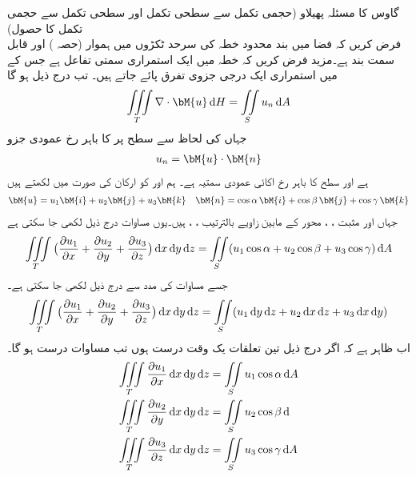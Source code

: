 \quad گاوس کا مسئلہ پھیلاو (حجمی تکمل سے سطحی تکمل اور سطحی تکمل سے حجمی تکمل کا حصول)\\
فرض کریں کہ فضا میں بند محدود خطہ  کی سرحد  ٹکڑوں میں ہموار (حصہ ) اور قابل سمت بند ہے۔مزید فرض کریں کہ خطہ  میں  ایک استمراری سمتی تفاعل ہے جس کے  میں استمراری ایک درجی جزوی تفرق پائے جاتے ہیں۔ تب درج ذیل ہو گا
\begin{align}\label{مساوات_خطی_تکمل_مسئلہ_گاوس_الف}
\iiint\limits_T \nabla \cdot \bM{u}\dif H=\iint\limits_S u_n\dif A
\end{align}
جہاں  کی لحاظ سے سطح  پر  کا باہر رخ عمودی جزو
\begin{align}\label{مساوات_خطی_تکمل_مسئلہ_گاوس_ب}
u_n=\bM{u}\cdot \bM{n}
\end{align}
ہے اور  سطح  کا باہر رخ  اکائی عمودی سمتیہ ہے۔
ہم  اور  کو ارکان کی صورت میں لکھتے ہیں
\begin{align*}
\bM{u}=u_1\bM{i}+u_2\bM{j}+u_3\bM{k} \quad \bM{n}=\cos \alpha \,\bM{i}+\cos \beta \,\bM{j}+\cos \gamma\,\bM{k} 
\end{align*}
جہاں  اور مثبت ، ،  محور کے مابین زاویے بالترتیب ، ،  ہیں۔یوں مساوات  درج ذیل لکھی جا سکتی ہے
\begin{align}\label{مساوات_خطی_تکمل_مسئلہ_گاوس_پ}
\iiint\limits_T \big(\frac{\partial u_1}{\partial x}+\frac{\partial u_2}{\partial y}+\frac{\partial u_3}{\partial z}\big)\dif x\dif y\dif z=\iint\limits_S (u_1\cos \alpha+u_2\cos \beta+u_3\cos \gamma)\dif A
\end{align}
جسے مساوات  کی مدد سے درج ذیل لکھی جا سکتی ہے۔
\begin{align}\label{مساوات_خطی_تکمل_مسئلہ_گاوس_ت}
\iiint\limits_T \big(\frac{\partial u_1}{\partial x}+\frac{\partial u_2}{\partial y}+\frac{\partial u_3}{\partial z}\big)\dif x\dif y\dif z=\iint\limits_S (u_1\dif y\dif z+u_2\dif x\dif z +u_3\dif x\dif y)
\end{align}
اب ظاہر ہے کہ اگر درج ذیل تین تعلقات یک وقت درست ہوں تب مساوات  درست ہو گا۔
\begin{align}
\iiint\limits_T \frac{\partial u_1}{\partial x}\dif x\dif y\dif z&=\iint\limits_S u_1\cos \alpha \dif A \label{مساوات_خطی_تکمل_مسئلہ_گاوس_ٹ}\\
\iiint\limits_T \frac{\partial u_2}{\partial y}\dif x\dif y\dif z&=\iint\limits_S u_2\cos \beta \dif \label{مساوات_خطی_تکمل_مسئلہ_گاوس_ث}\\
\iiint\limits_T \frac{\partial u_3}{\partial z}\dif x\dif y\dif z&=\iint\limits_S u_3\cos \gamma \dif A\label{مساوات_خطی_تکمل_مسئلہ_گاوس_ج}
\end{align}

